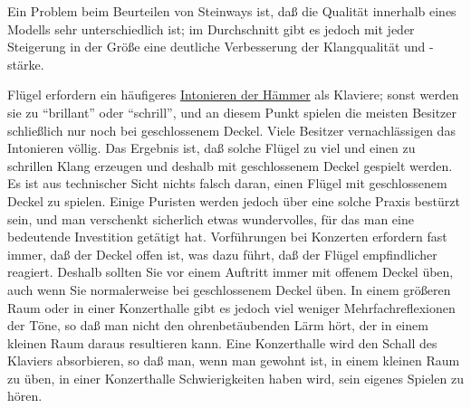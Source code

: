Ein Problem beim Beurteilen von Steinways ist, daß die Qualität innerhalb eines Modells sehr unterschiedlich ist; im Durchschnitt gibt es jedoch mit jeder Steigerung in der Größe eine deutliche Verbesserung der Klangqualität und -stärke.

Flügel erfordern ein häufigeres \hyperref[c2_7_hamm]{Intonieren der Hämmer} als Klaviere; sonst werden sie zu \enquote{brillant} oder \enquote{schrill}, und an diesem Punkt spielen die meisten Besitzer schließlich nur noch bei geschlossenem Deckel.
Viele Besitzer vernachlässigen das Intonieren völlig.
Das Ergebnis ist, daß solche Flügel zu viel und einen zu schrillen Klang erzeugen und deshalb mit geschlossenem Deckel gespielt werden.
Es ist aus technischer Sicht nichts falsch daran, einen Flügel mit geschlossenem Deckel zu spielen.
Einige Puristen werden jedoch über eine solche Praxis bestürzt sein, und man verschenkt sicherlich etwas wundervolles, für das man eine bedeutende Investition getätigt hat.
Vorführungen bei Konzerten erfordern fast immer, daß der Deckel offen ist, was dazu führt, daß der Flügel empfindlicher reagiert.
Deshalb sollten Sie vor einem Auftritt immer mit offenem Deckel üben, auch wenn Sie normalerweise bei geschlossenem Deckel üben.
In einem größeren Raum oder in einer Konzerthalle gibt es jedoch viel weniger Mehrfachreflexionen der Töne, so daß man nicht den ohrenbetäubenden Lärm hört, der in einem kleinen Raum daraus resultieren kann.
Eine Konzerthalle wird den Schall des Klaviers absorbieren, so daß man, wenn man gewohnt ist, in einem kleinen Raum zu üben, in einer Konzerthalle Schwierigkeiten haben wird, sein eigenes Spielen zu hören.

